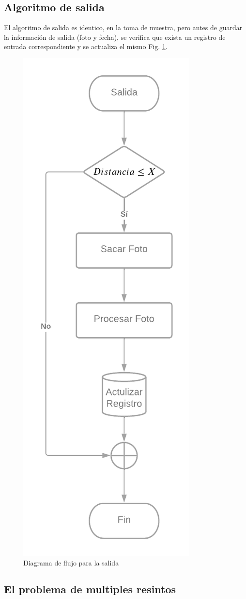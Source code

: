 \subsection{Algoritmo de salida}

El algoritmo de salida es identico, en la toma de muestra, pero antes de guardar la información de salida (foto y fecha), se verifica que exista un registro de entrada correspondiente y se actualiza el mismo Fig. \ref{fig:flujo-salida}.


\begin{figure}
    \centering
    \includegraphics[width=.5\textwidth]{imgs/flujo-salida.png}
    \caption{Diagrama de flujo para la salida}
    \label{fig:flujo-salida}
\end{figure}


\subsection{El problema de multiples resintos}

